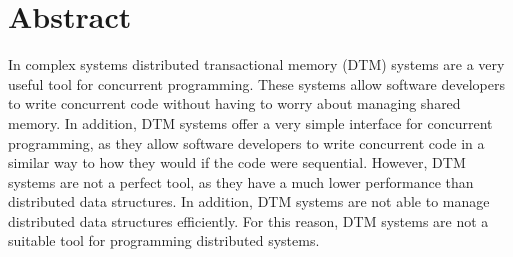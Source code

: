 \pagebreak
\thispagestyle{empty}
\section*{Abstract}

In complex systems distributed transactional memory (DTM) systems are a very useful tool for concurrent programming. These systems allow software developers to write concurrent code without having to worry about managing shared memory. In addition, DTM systems offer a very simple interface for concurrent programming, as they allow software developers to write concurrent code in a similar way to how they would if the code were sequential. However, DTM systems are not a perfect tool, as they have a much lower performance than distributed data structures. In addition, DTM systems are not able to manage distributed data structures efficiently. For this reason, DTM systems are not a suitable tool for programming distributed systems.

\vfill